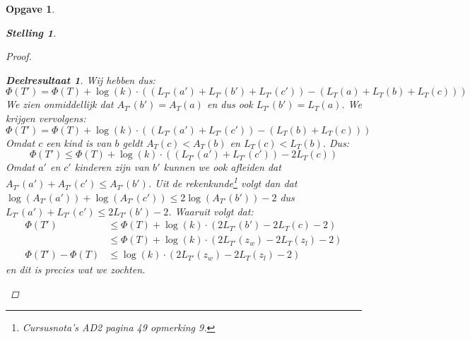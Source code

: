 \documentclass[12pt,hidelinks]{article}
\newtheorem{opgave}{Opgave}
\newtheorem{stelling}{Stelling}
\newtheorem{deelresultaat}{Deelresultaat}
\begin{document}
\begin{opgave}
\begin{description}
\begin{stelling}
\begin{proof}
\begin{deelresultaat}
                        Wij hebben dus:
                        $$\Phi(T') = \Phi(T) + \log(k)\cdot ((L_{T'}(a')+L_{T'}(b')+L_{T'}(c')) - (L_T(a)+L_T(b)+L_T(c)))$$
                        We zien onmiddellijk dat $A_{T'}(b')=A_T(a)$ en dus ook $L_{T'}(b')=L_T(a)$. We krijgen vervolgens:
                        $$\Phi(T') = \Phi(T) + \log(k)\cdot((L_{T'}(a')+L_{T'}(c')) - (L_T(b)+L_T(c)))$$
                        Omdat $c$ een kind is van $b$ geldt $A_T(c) < A_T(b)$ en $L_T(c) < L_T(b)$.
                        Dus:
                        $$\Phi(T') \le \Phi(T) +\log(k)\cdot((L_{T'}(a')+L_{T'}(c')) - 2L_T(c))$$
                        Omdat $a'$ en $c'$ kinderen zijn van $b'$ kunnen we ook afleiden dat $A_{T'}(a')+A_{T'}(c') \le A_{T'}(b')$. Uit de rekenkunde\footnote{Cursusnota's AD2 pagina 49 opmerking 9.} volgt dan dat $\log(A_{T'}(a'))+\log(A_{T'}(c')) \le 2\log(A_{T'}(b'))-2$ 
                        dus $L_{T'}(a')+L_{T'}(c') \le 2L_{T'}(b')-2$.
                        Waaruit volgt dat:
                        \begin{align*}
                            \Phi(T') &\le \Phi(T) +\log(k)\cdot( 2L_{T'}(b')-2L_T(c) - 2)\\
                            &\le \Phi(T) +\log(k)\cdot( 2L_{T'}(z_w)-2L_T(z_l)-2) \\
                            \Phi(T') - \Phi(T) &\le\log(k)\cdot( 2L_{T'}(z_w)-2L_T(z_l)-2)
                        \end{align*}
                        en dit is precies wat we zochten. 
                        

\end{deelresultaat}
\end{proof}
\end{stelling}
\end{description}
\end{opgave}
\end{document}
